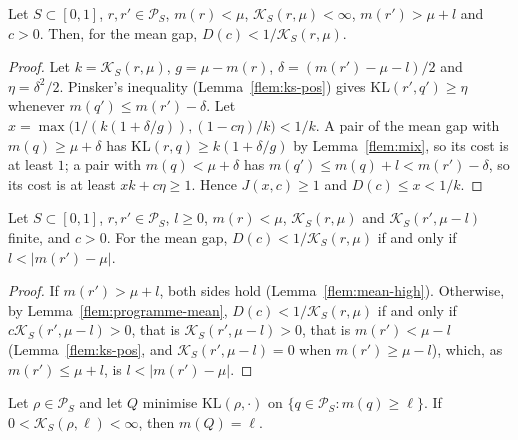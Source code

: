 \documentclass[11pt]{article}
\newcommand{\Simp}{\mathcal{P}_{S}}
\newcommand{\mean}{m}
\newcommand{\KL}{\mathrm{KL}}
\newcommand{\Ks}{\mathcal{K}_{S}}
\begin{document}
\begin{lemma}\label{flem:mean-high}
Let $S\subset[0,1]$, $r,r'\in\Simp$, $\mean(r)<\mu$, $\Ks(r,\mu)<\infty$, $\mean(r')>\mu+l$ and $c>0$.
Then, for the mean gap, $D(c)<1/\Ks(r,\mu)$.
\end{lemma}

\begin{proof}
Let $k=\Ks(r,\mu)$, $g=\mu-\mean(r)$, $\delta=(\mean(r')-\mu-l)/2$ and $\eta=\delta^2/2$. Pinsker's
inequality (Lemma~\ref{flem:ks-pos}) gives $\KL(r',q')\ge\eta$ whenever
$\mean(q')\le\mean(r')-\delta$. Let $x=\max\big(1/(k(1+\delta/g)),(1-c\eta)/k\big)<1/k$. A pair of the
mean gap with $\mean(q)\ge\mu+\delta$ has $\KL(r,q)\ge k(1+\delta/g)$ by Lemma~\ref{flem:mix}, so its
cost is at least $1$; a pair with $\mean(q)<\mu+\delta$ has $\mean(q')\le\mean(q)+l<\mean(r')-\delta$,
so its cost is at least $xk+c\eta\ge1$. Hence $J(x,c)\ge1$ and $D(c)\le x<1/k$.
\end{proof}

\begin{lemma}\label{flem:criteria-mean}
Let $S\subset[0,1]$, $r,r'\in\Simp$, $l\ge0$, $\mean(r)<\mu$, $\Ks(r,\mu)$ and $\Ks(r',\mu-l)$ finite,
and $c>0$. For the mean gap, $D(c)<1/\Ks(r,\mu)$ if and only if $l<|\mean(r')-\mu|$.
\end{lemma}

\begin{proof}
If $\mean(r')>\mu+l$, both sides hold (Lemma~\ref{flem:mean-high}). Otherwise, by
Lemma~\ref{flem:programme-mean}, $D(c)<1/\Ks(r,\mu)$ if and only if $c\Ks(r',\mu-l)>0$, that is
$\Ks(r',\mu-l)>0$, that is $\mean(r')<\mu-l$ (Lemma~\ref{flem:ks-pos}, and $\Ks(r',\mu-l)=0$ when
$\mean(r')\ge\mu-l$), which, as $\mean(r')\le\mu+l$, is $l<|\mean(r')-\mu|$.
\end{proof}

\begin{lemma}\label{flem:proj-level}
Let $\rho\in\Simp$ and let $Q$ minimise $\KL(\rho,\cdot)$ on $\{q\in\Simp:\mean(q)\ge\ell\}$. If
$0<\Ks(\rho,\ell)<\infty$, then $\mean(Q)=\ell$.
\end{lemma}
\end{document}
